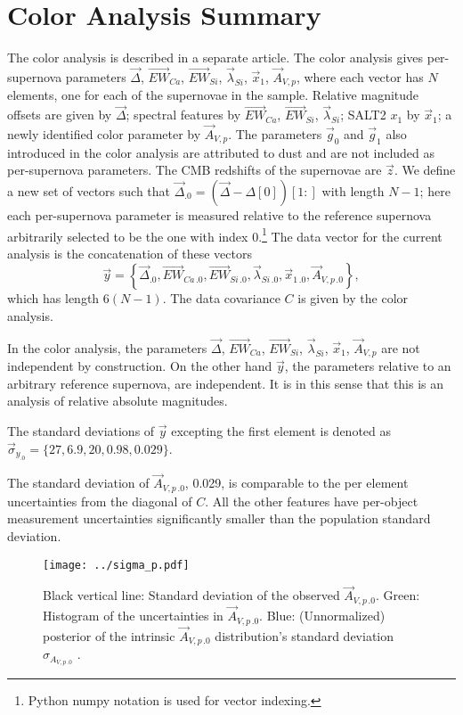 \documentclass{aastex61}   	%
\begin{document}
\section{Color Analysis Summary}
\label{color:sec}
The color analysis is described in a separate article.
The color analysis gives per-supernova parameters
$\vec{\Delta}$,  $\overrightarrow{EW}_{Ca}$,  $\overrightarrow{EW}_{Si}$,  $\vec{\lambda}_{Si}$,   $\vec{x}_1$,  $\vec{A}_{V,p}$,
where each vector has $N$ elements, one for each of the supernovae in the sample.  
Relative magnitude offsets are given by $\vec{\Delta}$; spectral features by $\overrightarrow{EW}_{Ca}$,  $\overrightarrow{EW}_{Si}$,  $\vec{\lambda}_{Si}$;
SALT2 $x_1$ by $\vec{x}_1$; a newly identified color parameter by $\vec{A}_{V,p}$.
The parameters $\vec{g}_0$ and $\vec{g}_1$ also introduced in the color analysis are attributed to dust
and are not included as per-supernova parameters.  The CMB redshifts of the supernovae are $\vec{z}$.  We define a new set of vectors such that
$\vec{\Delta}_{.0} = (\vec{\Delta} - \Delta[0])[1:]$ with length $N-1$; here each per-supernova parameter is measured relative to the
reference supernova arbitrarily selected to be the one with index 0.\footnote{Python numpy notation is used for vector indexing.}
The data vector for the current analysis is the concatenation of these vectors
\[
\vec{y} = \left\{\vec{\Delta}_{.0} , \overrightarrow{EW}_{Ca\,.0} ,  \overrightarrow{EW}_{Si\,.0},  \vec{\lambda}_{Si\,.0},   \vec{x}_{1\,.0}, \vec{A}_{V,p\,.0}\right\},
\]
which has length $6(N-1)$.  The data covariance $C$ is given by the color analysis.

In the color analysis, the parameters $\vec{\Delta}$,  $\overrightarrow{EW}_{Ca}$,  $\overrightarrow{EW}_{Si}$,  $\vec{\lambda}_{Si}$,   $\vec{x}_1$,  $\vec{A}_{V,p}$ are not independent by construction.  
On the other hand $\vec{y}$, the parameters relative to an arbitrary reference supernova, are independent.  It is in this sense that
this is an analysis of relative absolute magnitudes.

The standard deviations of $\vec{y}$ excepting the first element is denoted as $\vec{\sigma}_{y_{.0}}=\{27,  6.9,  20,   0.98,   0.029\}$.

The  standard deviation of $\vec{A}_{V,p\,.0}$, 0.029,  is comparable to the per element uncertainties from the diagonal of $C$.
All the other features have per-object measurement uncertainties significantly smaller than the population standard deviation.

\begin{figure}[htbp] %
   \centering
   \texttt{[image: ../sigma\_p.pdf]}
   \caption{Black vertical line: Standard deviation of the observed $\vec{A}_{V,p\,.0}$.
Green: Histogram of the uncertainties in $\vec{A}_{V,p\,.0}$.  
Blue: (Unnormalized) posterior of the intrinsic $\vec{A}_{V,p\,.0}$ distribution's standard deviation $\sigma_{{A}_{V,p\,.0}}$ .
   \label{sigma_p:fig}}
\end{figure}
\end{document}
